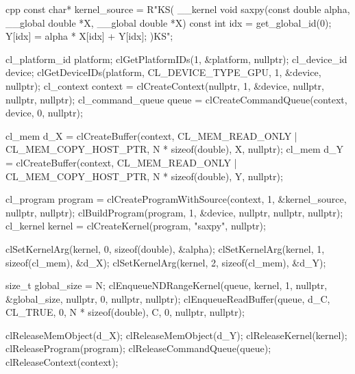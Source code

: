 \begin{listing}
    \begin{moderncode}[fontsize=\small]{cpp}
const char* kernel_source = R"KS(
__kernel void saxpy(const double alpha, __global double *X, __global double *X) {
    const int idx = get_global_id(0);
    Y[idx] = alpha * X[idx] + Y[idx];
}
)KS";

cl_platform_id platform;
clGetPlatformIDs(1, &platform, nullptr);
cl_device_id device;
clGetDeviceIDs(platform, CL_DEVICE_TYPE_GPU, 1, &device, nullptr);
cl_context context = clCreateContext(nullptr, 1, &device, nullptr, nullptr, nullptr);
cl_command_queue queue = clCreateCommandQueue(context, device, 0, nullptr);

cl_mem d_X = clCreateBuffer(context, CL_MEM_READ_ONLY | CL_MEM_COPY_HOST_PTR, N * sizeof(double), X, nullptr);
cl_mem d_Y = clCreateBuffer(context, CL_MEM_READ_ONLY | CL_MEM_COPY_HOST_PTR, N * sizeof(double), Y, nullptr);

cl_program program = clCreateProgramWithSource(context, 1, &kernel_source, nullptr, nullptr);
clBuildProgram(program, 1, &device, nullptr, nullptr, nullptr);
cl_kernel kernel = clCreateKernel(program, "saxpy", nullptr);

clSetKernelArg(kernel, 0, sizeof(double), &alpha);
clSetKernelArg(kernel, 1, sizeof(cl_mem), &d_X);
clSetKernelArg(kernel, 2, sizeof(cl_mem), &d_Y);

size_t global_size = N;
clEnqueueNDRangeKernel(queue, kernel, 1, nullptr, &global_size, nullptr, 0, nullptr, nullptr);
clEnqueueReadBuffer(queue, d_C, CL_TRUE, 0, N * sizeof(double), C, 0, nullptr, nullptr);

clReleaseMemObject(d_X); 
clReleaseMemObject(d_Y);
clReleaseKernel(kernel); 
clReleaseProgram(program);
clReleaseCommandQueue(queue); 
clReleaseContext(context);
    \end{moderncode}
    \caption{%
    A simple DAXPY example using \gls{opencl} including all necessary compilation, memory, and kernel launch operations. }
    \label{code:opencl_example}
\end{listing}

